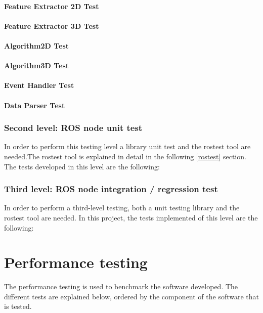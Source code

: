 			\subsubsection{Feature Extractor 2D Test}

			\subsubsection{Feature Extractor 3D Test}

			\subsubsection{Algorithm2D Test}

			\subsubsection{Algorithm3D Test}

			\subsubsection{Event Handler Test}

			\subsubsection{Data Parser Test}

	\subsection{Second level: ROS node unit test}
		In order to perform this testing level a library unit test and the rostest tool are needed.The rostest tool is explained in detail in the following \ref{rostest} section.\\

		The tests developed in this level are the following: 

	\subsection{Third level: ROS node integration / regression test}
		In order to perform a third-level testing, both a unit testing library and the rostest tool are needed. In this project, the tests implemented of this level are the following: 


\chapter{Performance testing}
The performance testing is used to benchmark the software developed. The different tests are explained below, ordered by the component of the software that is tested. 


